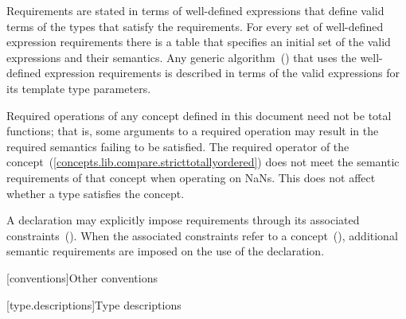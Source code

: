 
\setcounter{Paras}{3}
\pnum
Requirements are stated in terms of well-defined expressions that define valid terms of
the types that satisfy the requirements. For every set of well-defined expression
requirements there is 
a table that specifies an initial set of the valid expressions and
their semantics. Any generic algorithm~() that uses the
well-defined expression requirements is described in terms of the valid expressions for
its template type parameters.


\setcounter{Paras}{6}
\begin{addedblock}
\pnum
Required operations of any concept defined in this document need not be
total functions; that is, some arguments to a required operation may
result in the required semantics failing to be satisfied. \enterexample
The required \tcode{<} operator of the 
concept~(\ref{concepts.lib.compare.stricttotallyordered}) does not meet the
semantic requirements of that concept when operating on NaNs.\exitexample
This does not affect whether a type satisfies the concept.

\pnum
A declaration may explicitly impose requirements through its associated
constraints~(). When the associated constraints
refer to a concept~(), additional semantic requirements are
imposed on the use of the declaration.
\end{addedblock}

[conventions]{Other conventions}

[type.descriptions]{Type descriptions}

